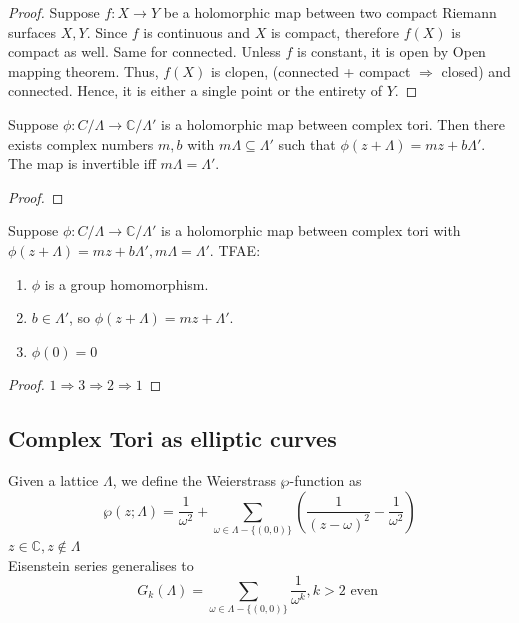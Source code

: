 \documentclass[oneside, 12pt]{scrbook}
\newcommand{\CC}{\mathbb C}
\theoremstyle{theorem}
\begin{document}
\begin{proof}
Suppose $f: X\rightarrow Y$ be a holomorphic map between two compact Riemann surfaces $X,Y$. Since $f$ is continuous and $X$ is compact, therefore $f(X)$ is compact as well. Same for connected. Unless $f$ is constant, it is open by Open mapping theorem. Thus, $f(X)$ is clopen, (connected + compact $\Rightarrow$ closed) and connected. Hence, it is either a single point or the entirety of $Y$. 
\end{proof}

\begin{proposition}
Suppose $\phi: C/\Lambda \rightarrow \CC/\Lambda '$ is a holomorphic map between complex tori. Then there exists complex numbers $m,b$ with $m \Lambda \subseteq  \Lambda '$ such that $\phi(z + \Lambda) = mz + b \Lambda '$. The map is invertible iff $m \Lambda = \Lambda '$.
\end{proposition}

\begin{proof}

\end{proof}

\begin{corollary}
Suppose $\phi: C/\Lambda \rightarrow \CC/\Lambda '$ is a holomorphic map between complex tori with $\phi(z + \Lambda) = mz + b \Lambda ' , m \Lambda = \Lambda '$. TFAE: 
\begin{enumerate}
\item $\phi$ is a group homomorphism.
\item $b \in \Lambda '$, so $\phi(z + \Lambda) = mz + \Lambda '$.
\item $\phi(0)=0$
\end{enumerate}
\end{corollary}

\begin{proof}
$1 \Rightarrow 3 \Rightarrow 2 \Rightarrow 1$
\end{proof}

\subsection{Complex Tori as elliptic curves}

\begin{definition}
Given a lattice $\Lambda$, we define the Weierstrass $\wp$-function as 
\begin{equation}
\wp(z;\Lambda) = \frac{1}{\omega^2} + \sum_{\omega \in \Lambda - \{(0,0)\}} \left( \frac{1}{(z-\omega)^2} -\frac{1}{\omega^2} \right)
\end{equation}
$z \in \CC , z\not \in \Lambda$ \\

Eisenstein series generalises to 
\begin{equation}
G_{k}(\Lambda) = \sum_{\omega \in \Lambda - \{(0,0)\}} \frac{1}{\omega^k} , k>2 \text{ even }
\end{equation}
\end{definition}
\end{document}
